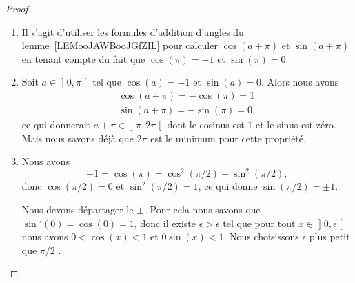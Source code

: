 \begin{proof}
\begin{enumerate}
            Mais d'un autre côté, le nombre \( 2\pi\) est le plus petit \( T\) vérifiant \( \cos(T)=1\), \( \sin(T)=0\). Donc avoir \( \cos(\pi)=1\) n'est pas possible. Nous concluons
            \begin{subequations}
                \begin{numcases}{}
                    \cos(\pi)=-1\\
                    \sin(\pi)=0.
                \end{numcases}
            \end{subequations}
        \item
            Il s'agit d'utiliser les formules d'addition d'angles du lemme~\ref{LEMooJAWBooJGfZIL} pour calculer \( \cos(a+\pi)\) et \( \sin(a+\pi)\) en tenant compte du fait que \( \cos(\pi)=-1\) et \( \sin(\pi)=0\).
        \item
        Soit \( a\in\mathopen] 0 , \pi \mathclose[\) tel que \( \cos(a)=-1\) et \( \sin(a)=0\). Alors nous avons
            \begin{subequations}
                \begin{align}
                    \cos(a+\pi)=-\cos(\pi)=1\\
                    \sin(a+\pi)=-\sin(\pi)=0,
                \end{align}
            \end{subequations}
        ce qui donnerait \( a+\pi\in\mathopen] \pi , 2\pi \mathclose[\) dont le cosinus est \( 1\) et le sinus est zéro. Mais nous savons déjà que \( 2\pi\) est le minimum pour cette propriété.
        \item
            Nous avons
            \begin{equation}
                -1=\cos(\pi)=\cos^2(\pi/2)-\sin^2(\pi/2),
            \end{equation}
            donc \( \cos(\pi/2)=0\) et \( \sin^2(\pi/2)=1\), ce qui donne \( \sin(\pi/2)=\pm 1\).

        Nous devons départager le \( \pm\). Pour cela nous savons que \( \sin'(0)=\cos(0)=1\), donc il existe \( \epsilon>\epsilon\) tel que pour tout \( x\in\mathopen] 0 , \epsilon \mathclose[\) nous avons \( 0<\cos(x)<1\) et \( 0\sin(x)<1\). Nous choisissons \( \epsilon\) plus petit que \( \pi/2\) .


\end{enumerate}
\end{proof}
